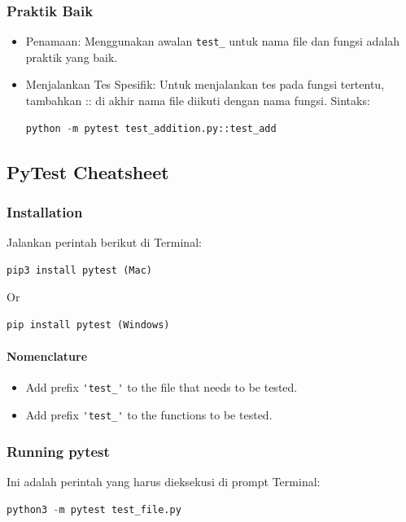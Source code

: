 \documentclass{article}
\begin{document}
\subsubsection{Praktik Baik}
\begin{itemize}
    \item Penamaan: Menggunakan awalan \verb|test_| untuk nama file dan fungsi adalah praktik yang baik.
    \item Menjalankan Tes Spesifik: Untuk menjalankan tes pada fungsi tertentu, tambahkan :: di akhir nama file diikuti dengan nama fungsi.
          Sintaks:
          \begin{lstlisting}[language=Python, caption={}, captionpos=b]
python -m pytest test_addition.py::test_add
\end{lstlisting}
\end{itemize}

\subsection{PyTest Cheatsheet}
\subsubsection{Installation}
Jalankan perintah berikut di Terminal:
\begin{lstlisting}[language=Python, caption={}, captionpos=b]
    pip3 install pytest (Mac)
\end{lstlisting}
Or
\begin{lstlisting}[language=Python, caption={}, captionpos=b]
    pip install pytest (Windows)
\end{lstlisting}
\paragraph{Nomenclature}

\begin{itemize}
    \item Add prefix \verb|'test_'| to the file that needs to be tested.
    \item Add prefix \verb|'test_'| to the functions to be tested.
\end{itemize}

\subsubsection{Running pytest}
Ini adalah perintah yang harus dieksekusi di prompt Terminal:
\begin{lstlisting}[language=Python, caption={}, captionpos=b]
    python3 -m pytest test_file.py
\end{lstlisting}
\end{document}
